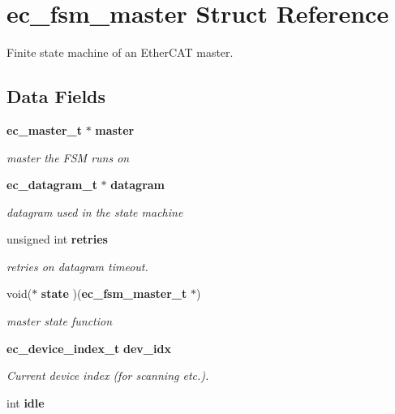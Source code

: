 \section{ec\-\_\-fsm\-\_\-master \-Struct \-Reference}
\label{structec__fsm__master}


\-Finite state machine of an \-Ether\-C\-A\-T master.  


\subsection*{\-Data \-Fields}
\begin{DoxyCompactItemize}
\item 
{\bf ec\-\_\-master\-\_\-t} $\ast$ {\bf master}\label{structec__fsm__master_af5597239477f215c744aad387d7baa6b}

\begin{DoxyCompactList}\small\item\em master the \-F\-S\-M runs on \end{DoxyCompactList}\item 
{\bf ec\-\_\-datagram\-\_\-t} $\ast$ {\bf datagram}\label{structec__fsm__master_a518334a40bb6eeea55081a997bbaebc2}

\begin{DoxyCompactList}\small\item\em datagram used in the state machine \end{DoxyCompactList}\item 
unsigned int {\bf retries}
\begin{DoxyCompactList}\small\item\em retries on datagram timeout. \end{DoxyCompactList}\item 
void($\ast$ {\bf state} )({\bf ec\-\_\-fsm\-\_\-master\-\_\-t} $\ast$)\label{structec__fsm__master_a604e1597e8447699b14b5fa8298980a6}

\begin{DoxyCompactList}\small\item\em master state function \end{DoxyCompactList}\item 
{\bf ec\-\_\-device\-\_\-index\-\_\-t} {\bf dev\-\_\-idx}\label{structec__fsm__master_ab57f14b0c615bae6428ff89ef2cb7ef0}

\begin{DoxyCompactList}\small\item\em \-Current device index (for scanning etc.). \end{DoxyCompactList}\item 
int {\bf idle}\label{structec__fsm__master_aa06626b21389030366d7aed5f525c6c0}


\end{DoxyCompactItemize}

